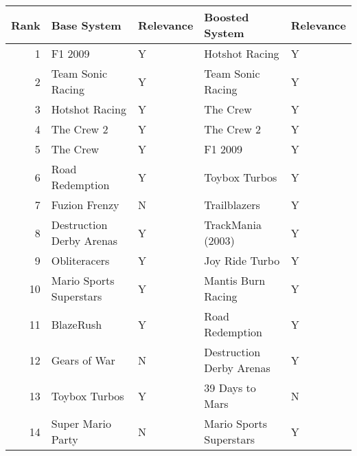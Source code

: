 \begin{tabular}{rllll}
\toprule
 Rank &                                 Base System & Relevance &                                    Boosted System & Relevance \\
\midrule
    1 &                                     F1 2009 &         Y &                                    Hotshot Racing &         Y \\
    2 &                           Team Sonic Racing &         Y &                                 Team Sonic Racing &         Y \\
    3 &                              Hotshot Racing &         Y &                                          The Crew &         Y \\
    4 &                                  The Crew 2 &         Y &                                        The Crew 2 &         Y \\
    5 &                                    The Crew &         Y &                                           F1 2009 &         Y \\
    6 &                             Road Redemption &         Y &                                     Toybox Turbos &         Y \\
    7 &                               Fuzion Frenzy &         N &                                      Trailblazers &         Y \\
    8 &                    Destruction Derby Arenas &         Y &                                 TrackMania (2003) &         Y \\
    9 &                                Obliteracers &         Y &                                    Joy Ride Turbo &         Y \\
   10 &                     Mario Sports Superstars &         Y &                                Mantis Burn Racing &         Y \\
   11 &                                   BlazeRush &         Y &                                   Road Redemption &         Y \\
   12 &                                Gears of War &         N &                          Destruction Derby Arenas &         Y \\
   13 &                               Toybox Turbos &         Y &                                   39 Days to Mars &         N \\
   14 &                           Super Mario Party &         N &                           Mario Sports Superstars &         Y \\

\end{tabular}
